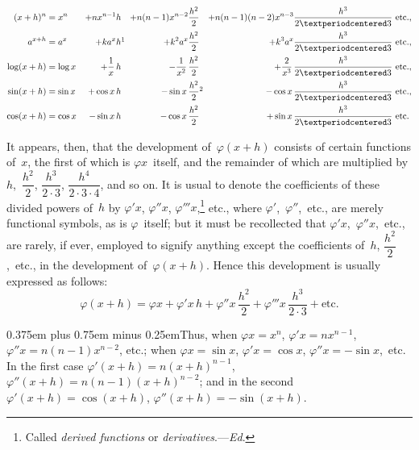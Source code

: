 \documentclass[12pt]{book}[2005/09/16]
\newcommand{\Chg}[2]{#2}
\newcommand{\Add}[1]{\Chg{}{#1}}
\newcommand{\Loosen}{\spaceskip 0.375em plus 0.75em minus 0.25em}
\newcommand{\Pagelabel}[1]{\phantomsection\label{page:#1}}
\newcommand{\PageSep}[1]{\Pagelabel{#1}\ignorespaces}
\renewcommand{\etc}{\text{etc}}
\newcommand{\Ed}{\textit{Ed}}
\renewcommand{\(}{{\upshape(}}
\renewcommand{\)}{{\upshape)}}
\renewcommand{\phi}{\varphi}
\begin{document}
{\scriptsize
\begin{alignat*}{4}
(x + h)^{n} &= x^{n}
    &+ nx^{n-1}h
   &&+ n(n - 1)x^{n-2} \frac{h^{2}}{2}
   &&+ n(n - 1)(n - 2)x^{n-3} \frac{h^{3}}{2·3} &\ \etc.\Add{,} \\
%
a^{x + h} &= a^{x}
    &+ ka^{x} h\rlap{\normalsize\footnotemark[1]}
   &&+ k^{2} a^{x} \frac{h^{2}}{2}
   &&+ k^{3} a^{x} \frac{h^{3}}{2·3} &\ \etc.\Add{,} \\
%
\log(x + h) &= \log x
    &+ \frac{1}{x}\, h
   &&- \frac{1}{x^{2}}\, \frac{h^{2}}{2}
   &&+ \frac{2}{x^{3}}\, \frac{h^{3}}{2·3} &\ \etc.\Add{,} \\
%
\sin(x + h) &= \sin x
    &+ \cos x\, h
   &&- \sin x\, \frac{h^{2}}{2}\rlap{\normalsize\footnotemark[2]}
   &&- \cos x\, \frac{h^{3}}{2·3} &\ \etc.\Add{,} \\
%
\cos(x + h) &= \cos x
    &- \sin x\, h
   &&- \cos x\, \frac{h^{2}}{2}
   &&+ \sin x\, \frac{h^{3}}{2·3} &\ \etc.
\end{alignat*}}%
%
\PageSep{21}

It appears, then, that the development of~$\phi(x + h)$
consists of certain functions of~$x$, the first of which is
$\phi x$~itself, and the remainder of which are multiplied
by $h$,~$\dfrac{h^{2}}{2}$, $\dfrac{h^{3}}{2·3}$, $\dfrac{h^{4}}{2·3·4}$, and so on. It is usual to denote
the coefficients of these divided powers of~$h$ by $\phi' x$,
$\phi'' x$, $\phi''' x$,\footnote
  {Called \emph{derived functions} or \emph{derivatives}.---\Ed.}
%
%
%
etc., where $\phi'$,~$\phi''$,~etc., are merely functional
symbols, as is $\phi$~itself; but it must be recollected
that $\phi' x$,~$\phi'' x$,~etc., are rarely, if ever, employed
to signify anything except the coefficients of~$h$, $\dfrac{h^{2}}{2}$,~etc.,
in the development of~$\phi(x + h)$. Hence this development
is usually expressed as follows:
\[
\phi(x + h)
  = \phi x + \phi' x\, h + \phi''x\, \frac{h^{2}}{2} + \phi''' x\, \frac{h^{3}}{2·3} + \etc.
\]

{\Loosen Thus, when $\phi x = x^{n}$, $\phi' x = nx^{n-1}$, $\phi'' x = n(n - 1)x^{n-2}$, etc.;
when $\phi x = \sin x$, $\phi' x = \cos x$, $\phi'' x = -\sin x$,~etc.
In the first case $\phi'(x + h) = n(x + h)^{n-1}$,
$\phi''(x + h) = n(n - 1)(x + h)^{n-2}$; and in the second
$\phi'(x + h) = \cos (x + h)$, $\phi''(x + h) = -\sin(x + h)$.}
\end{document}
